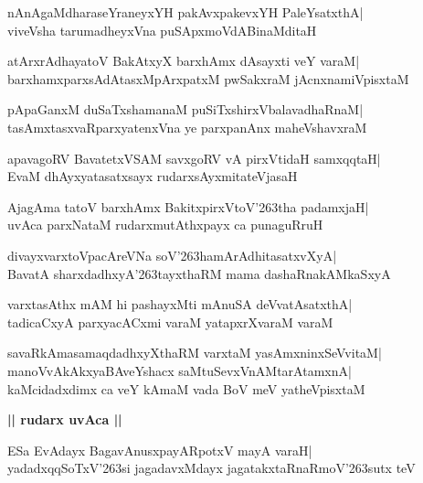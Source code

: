 \documentclass[twoside,12pt,openright]{book}
\def\S{\char'263}
\newcounter{shloka}[chapter]
\def\uvaca#1{\centerline{{\large\textbf{#1}}}}
\begin{document}
\begin{shloka}%
nAnAgaMdharaseYraneyxYH pakAvxpakevxYH PaleYsatxthA|\\
viveVsha tarumadheyxVna puSApxmoVdABinaMditaH
\end{shloka}

\begin{shloka}%
atArxrAdhayatoV BakAtxyX barxhAmx dAsayxti veY varaM|\\
barxhamxparxsAdAtasxMpArxpatxM pwSakxraM jAcnxnamiVpisxtaM
\end{shloka}

\begin{shloka}%
pApaGanxM duSaTxshamanaM puSiTxshirxVbalavadhaRnaM|\\
tasAmxtasxvaRparxyatenxVna ye parxpanAnx maheVshavxraM
\end{shloka}

\begin{shloka}%
apavagoRV BavatetxVSAM savxgoRV vA pirxVtidaH samxqqtaH|\\
EvaM dhAyxyatasatxsayx rudarxsAyxmitateVjasaH
\end{shloka}

\begin{shloka}%
AjagAma tatoV barxhAmx BakitxpirxVtoV\S tha padamxjaH|\\
uvAca parxNataM rudarxmutAthxpayx ca punaguRruH
\end{shloka}

\begin{shloka}%
divayxvarxtoVpacAreVNa soV\S hamArAdhitasatxvXyA|\\
BavatA sharxdadhxyA\S tayxthaRM mama dashaRnakAMkaSxyA
\end{shloka}

\begin{shloka}%
varxtasAthx mAM hi pashayxMti mAnuSA deVvatAsatxthA|\\
tadicaCxyA parxyacACxmi varaM yatapxrXvaraM varaM
\end{shloka}

\begin{shloka}%
savaRkAmasamaqdadhxyXthaRM varxtaM yasAmxninxSeVvitaM|\\
manoVvAkAkxyaBAveYshacx saMtuSevxVnAMtarAtamxnA|\\
kaMcidadxdimx ca veY kAmaM vada BoV meV yatheVpisxtaM
\end{shloka}

\uvaca{|| rudarx uvAca ||}
\begin{shloka}%
ESa EvAdayx BagavAnusxpayARpotxV mayA varaH|\\
yadadxqqSoTxV\S si jagadavxMdayx jagatakxtaRnaRmoV\S sutx teV
\end{shloka}
\end{document}

